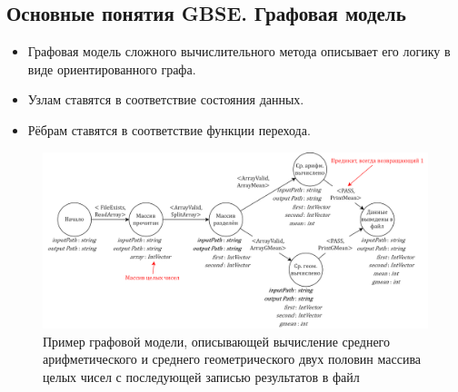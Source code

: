 \subsection{Основные понятия GBSE. Графовая модель}
\begin{frame}
	\begin{itemize}
		\item Графовая модель сложного вычислительного метода описывает его логику в виде ориентированного графа.
		\item Узлам ставятся в соответствие состояния данных.
		\item Рёбрам ставятся в соответствие функции перехода.
	\end{itemize}

	\begin{figure}
		\centering
		\includegraphics[width=\textwidth]{images/illustration.graph.png}
		\caption{Пример графовой модели, описывающей вычисление среднего арифметического и среднего геометрического двух половин массива целых чисел с последующей записью результатов в файл}
	\end{figure}

\end{frame}

